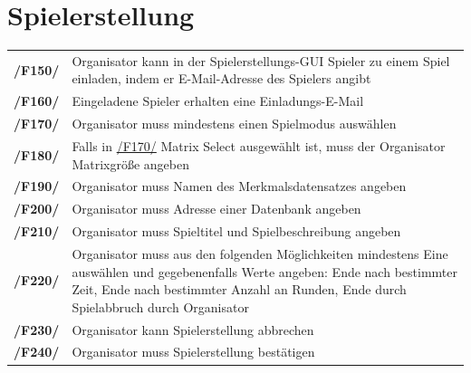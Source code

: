 \documentclass[a4paper]{scrreprt}
\begin{document}
    \section{Spielerstellung}
    \begin{tabularx}{\linewidth}{@{}>{\bfseries}l@{\hspace{.5em}}X@{}}
    \hypertarget{F150}{/F150/} & \Gls{Organisator} kann in der Spielerstellungs-GUI \Gls{Spieler} zu einem \Gls{Spiel} einladen, indem er E-Mail-Adresse des \Gls{Spieler}s angibt \\
    \hypertarget{F160}{/F160/} & Eingeladene \Gls{Spieler} erhalten eine Einladungs-E-Mail \\
    \hypertarget{F170}{/F170/} & \Gls{Organisator} muss mindestens einen \Gls{Spielmodus} auswählen \\
    \hypertarget{F180}{/F180/} & Falls in \hyperlink{F170}{/F170/} \Gls{Matrix Select} ausgewählt ist, muss der \Gls{Organisator} Matrixgröße angeben \\
    \hypertarget{F190}{/F190/} & \Gls{Organisator} muss Namen des Merkmalsdatensatzes angeben \\
    \hypertarget{F200}{/F200/} & \Gls{Organisator} muss Adresse einer Datenbank angeben \\ %
    \hypertarget{F210}{/F210/} & \Gls{Organisator} muss Spieltitel und Spielbeschreibung angeben \\ %
    \hypertarget{F220}{/F220/} & \Gls{Organisator} muss aus den folgenden Möglichkeiten mindestens Eine auswählen und gegebenenfalls Werte angeben: Ende nach bestimmter Zeit, Ende nach bestimmter Anzahl an Runden, Ende durch Spielabbruch durch Organisator \\
    \hypertarget{F230}{/F230/} & \Gls{Organisator} kann Spielerstellung abbrechen \\
    \hypertarget{F240}{/F240/} & \Gls{Organisator} muss Spielerstellung bestätigen \\
    \end{tabularx}
    
\end{document}
